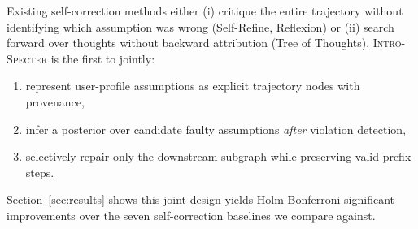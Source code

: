 Existing self-correction methods either (i) critique the entire
trajectory without identifying which assumption was wrong (Self-Refine,
Reflexion) or (ii) search forward over thoughts without backward
attribution (Tree of Thoughts). \textsc{Intro-Specter} is the first to
jointly:
\begin{enumerate}[leftmargin=*,itemsep=2pt,topsep=2pt]
\item represent user-profile assumptions as explicit trajectory nodes
with provenance,
\item infer a posterior over candidate faulty assumptions \emph{after}
violation detection,
\item selectively repair only the downstream subgraph while preserving
valid prefix steps.
\end{enumerate}
Section~\ref{sec:results} shows this joint design yields
Holm-Bonferroni-significant improvements over the seven self-correction
baselines we compare against.
